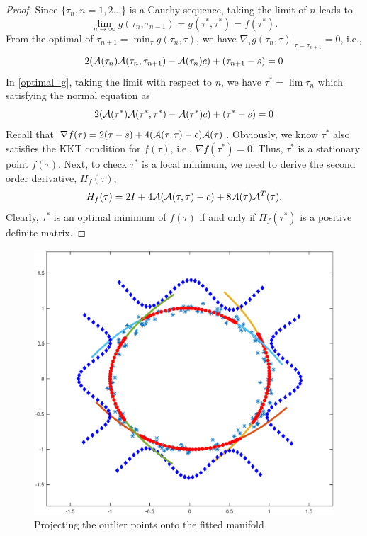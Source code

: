 \documentclass[aos,preprint]{imsart}
\theoremstyle{remark}
\begin{document}
\begin{proof}
Since $\{\tau_n, n=1,2...\}$ is a Cauchy sequence, taking the limit of $n$ leads to
\[
\lim_{n\rightarrow\infty} g(\tau_n,\tau_{n-1}) = g(\tau^*,\tau^*) = f(\tau^*).
\]
From the optimal of $\tau_{n+1}=\min_{\tau} g(\tau_n,\tau)$, we have $\nabla_{\tau} g(\tau_n,\tau)|_{\tau=\tau_{n+1}}=0$, i.e.,
\begin{equation}\label{optimal_g}
2({\cal A}(\tau_n){\cal A}(\tau_n,\tau_{n+1})-{\cal A}(\tau_n)c) +(\tau_{n+1}-s)= 0
\end{equation}
In \eqref{optimal_g}, taking the limit with respect to $n$, we have $\tau^*=\lim \tau_n$ which satisfying the normal equation as
\begin{equation}\label{normal}
2({\cal A}(\tau^*){\cal A}(\tau^*,\tau^*)-{\cal A}(\tau^*)c) +(\tau^*-s)= 0
\end{equation}
Recall that $\nabla f(\tau) = 2(\tau-s)+4({\cal A}(\tau,\tau)-c) {\cal A}(\tau)$.
Obviously, we know $\tau^*$ also satisfies the KKT condition for $f(\tau)$, i.e.,
$\nabla f(\tau^*) = 0$.  Thus, $\tau^*$ is a stationary point $f(\tau)$. Next, to check $\tau^*$ is a local minimum, we need to derive the second order derivative, $H_f(\tau)$,
\[
H_f(\tau) = 2I+4{\cal A}({\cal A}(\tau,\tau)-c) + 8{\cal A}(\tau){\cal A}^T(\tau).
\]
Clearly, $\tau^*$ is an optimal minimum of $f(\tau)$ if and only if $H_f(\tau^*) $ is a positive definite matrix.
\end{proof}

\begin{figure}[t] %
   \centering
   \includegraphics[width=0.65\linewidth]{fit_demo.eps} 
   \caption{Projecting the outlier points onto the fitted manifold}
   \label{fig:example}
\end{figure}
\end{document}

